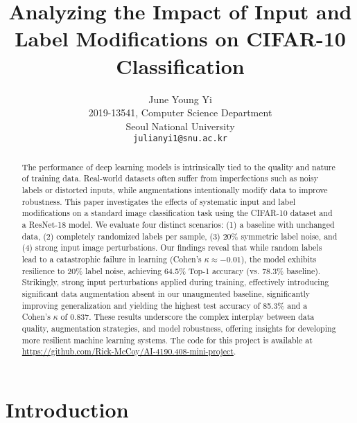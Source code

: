 \documentclass[10pt,twocolumn,letterpaper]{article}
\begin{document}
\title{Analyzing the Impact of Input and Label Modifications on CIFAR-10 Classification}

\author{June Young Yi\\ %
2019-13541, Computer Science Department\\
Seoul National University\\ %
{\tt\small julianyi1@snu.ac.kr} %
}

\maketitle

\begin{abstract}
    The performance of deep learning models is intrinsically tied to the quality and nature of training data. Real-world datasets often suffer from imperfections such as noisy labels or distorted inputs, while augmentations intentionally modify data to improve robustness. This paper investigates the effects of systematic input and label modifications on a standard image classification task using the CIFAR-10 dataset and a ResNet-18 model. We evaluate four distinct scenarios: (1) a baseline with unchanged data, (2) completely randomized labels per sample, (3) 20\% symmetric label noise, and (4) strong input image perturbations. Our findings reveal that while random labels lead to a catastrophic failure in learning (Cohen's $\kappa \approx -0.01$), the model exhibits resilience to 20\% label noise, achieving 64.5\% Top-1 accuracy (vs. 78.3\% baseline). Strikingly, strong input perturbations applied during training, effectively introducing significant data augmentation absent in our unaugmented baseline, significantly improving generalization and yielding the highest test accuracy of 85.3\% and a Cohen's $\kappa$ of 0.837. These results underscore the complex interplay between data quality, augmentation strategies, and model robustness, offering insights for developing more resilient machine learning systems. The code for this project is available at \url{https://github.com/Rick-McCoy/AI-4190.408-mini-project}.
\end{abstract}

\section{Introduction}
\label{sec:intro}
\end{document}
